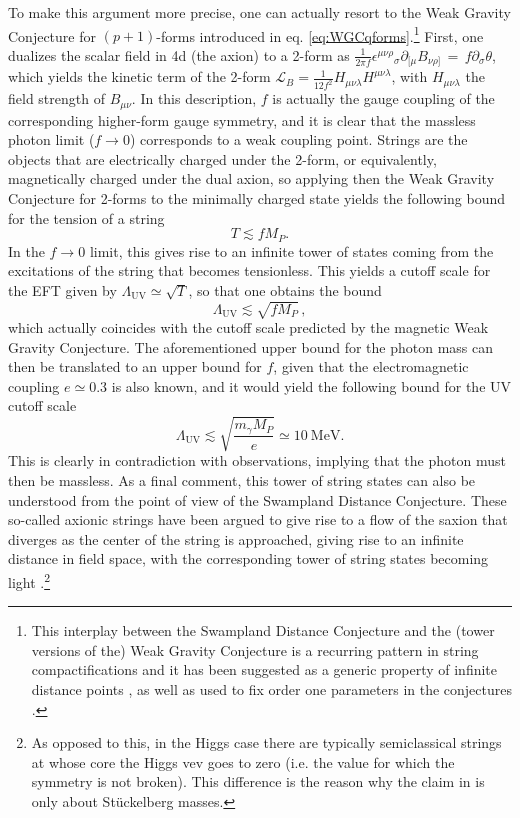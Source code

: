 \documentclass[11pt,a4paper]{article}
\begin{document}
To make this argument more precise, one can actually resort to the Weak Gravity Conjecture for $(p+1)$-forms introduced in eq. \eqref{eq:WGCqforms}.\footnote{This interplay between the Swampland Distance Conjecture and the (tower versions of the) Weak Gravity Conjecture is a recurring pattern in string compactifications and it has been suggested as a generic property of infinite distance points \cite{Grimm:2018ohb}, as well as used to fix order one parameters in the conjectures \cite{Gendler:2020dfp,Bastian:2020egp}.} First, one dualizes the scalar field in 4d (the axion) to a 2-form as $\frac{1}{2\pi f} \epsilon^{\mu \nu \rho}{}_{\sigma} \partial_{[\mu} B_{\nu \rho]}\, = \, f \partial_{\sigma} \theta$, which yields the kinetic term of the 2-form $\mathcal{L}_{B}=\frac{1}{12 f^{2}} H_{\mu \nu \lambda} H^{\mu \nu \lambda}$, with $H_{\mu \nu \lambda}$ the field strength of $B_{\mu \nu}$. In this description, $f$ is actually the gauge coupling of the corresponding higher-form gauge symmetry, and it is clear that the massless photon limit ($f\rightarrow 0$) corresponds to a weak coupling point. Strings are the objects that are electrically charged under the 2-form, or equivalently, magnetically charged under the dual axion, so applying then the Weak Gravity Conjecture for 2-forms to the minimally charged state yields the following bound for the tension of a string 
\begin{equation}
T \lesssim f M_P.
\end{equation}
In the $f\rightarrow 0$ limit, this gives rise to an infinite tower of states coming from the excitations of the string that becomes tensionless. This yields a cutoff scale for the EFT given by $\Lambda_{\mathrm{UV}} \simeq \sqrt{T}$, so that one obtains the bound
\begin{equation}
\Lambda_{\mathrm{UV}} \lesssim \sqrt{f M_P}\, ,
\end{equation}
which actually coincides with the cutoff scale predicted by the magnetic Weak Gravity Conjecture. The aforementioned upper bound for the photon mass can then be translated to an upper bound for $f$, given that the electromagnetic coupling $e\simeq 0.3$ is also known, and it would yield the following bound for the UV cutoff scale
\begin{equation}
\Lambda_{\mathrm{UV}} \lesssim \sqrt{\dfrac{m_{\gamma} M_P}{e}} \simeq10 \ \text{MeV}.
\end{equation}
This is clearly in contradiction with observations, implying that the photon must then be massless. As a final comment, this tower of string states can also be understood from the point of view of the Swampland Distance Conjecture. These so-called axionic strings have been argued to give rise to a flow of the saxion that diverges as the center of the string is approached, giving rise to an infinite distance in field space, with the corresponding tower of string states becoming light \cite{Lanza:2020qmt, Lanza:2021qsu}.\footnote{As opposed to this, in the Higgs case there are typically semiclassical strings at whose core the Higgs vev goes to zero (i.e. the value for which the symmetry is not broken). This difference is the reason why the claim in \cite{Reece:2018zvv} is only about St\"uckelberg masses.} 
\end{document}
